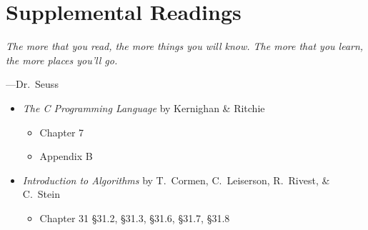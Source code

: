 \section{Supplemental Readings}

\epigraph{\emph{The more that you read, the more things you will know. The
more that you learn, the more places you'll go.}}{---Dr.\ Seuss}

\begin{itemize}
  \item \textit{The C Programming Language} by Kernighan \& Ritchie
  \begin{itemize}
    \item Chapter 7
    \item Appendix B
  \end{itemize}
  \item \textit{Introduction to Algorithms} by T.\ Cormen, C.\
    Leiserson, R.\ Rivest, \& C.\ Stein
    \begin{itemize}
      \item Chapter 31 \S 31.2, \S 31.3, \S 31.6, \S 31.7, \S 31.8
    \end{itemize}
\end{itemize}
